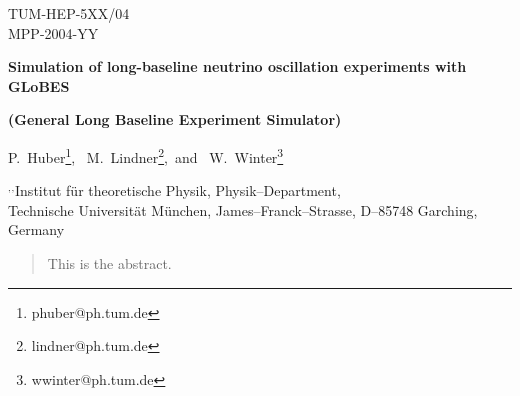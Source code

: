 \documentclass[12pt,a4paper]{article}
\begin{document}

\begin{titlepage}

\renewcommand{\thefootnote}{\alph{footnote}}

\vspace*{-3.cm}
\begin{flushright}
TUM-HEP-5XX/04\\
MPP-2004-YY\\
\end{flushright}

\vspace*{0.5cm}

\renewcommand{\thefootnote}{\fnsymbol{footnote}}
\setcounter{footnote}{-1}

{\begin{center}
{\Large\bf Simulation of long-baseline neutrino oscillation
experiments with GLoBES}
\end{center}}
{\begin{center}
{\large\bf (General Long Baseline Experiment Simulator)}
\end{center}}
\renewcommand{\thefootnote}{\alph{footnote}}

\vspace*{.8cm}
{\begin{center} {\large{\sc
                P.~Huber\footnote[1]{
                phuber@ph.tum.de},~
                M.~Lindner\footnote[2]{
                lindner@ph.tum.de},~and~
                W.~Winter\footnote[5]{
                wwinter@ph.tum.de}
                }}
\end{center}}
\vspace*{0cm}
{\it
\begin{center}

\footnotemark[1]${}^,$\footnotemark[2]${}^,$\footnotemark[3]%
       Institut f\"ur theoretische Physik, Physik--Department,\\
       Technische Universit\"at M\"unchen,
       James--Franck--Strasse, D--85748 Garching, Germany


\end{center}}

\vspace*{1cm}


\begin{abstract}
This is the abstract.
\end{abstract}


\vspace*{.5cm}


\end{titlepage}
\end{document}
